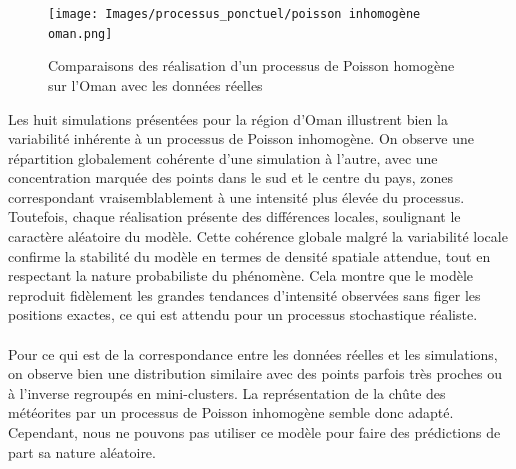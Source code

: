\documentclass[12pt]{article}
\begin{document}
\begin{figure}[H]
    \centering
    \texttt{[image: Images/processus\_ponctuel/poisson inhomogène oman.png]}
    \caption{Comparaisons des réalisation d'un processus de Poisson homogène sur l'Oman avec les données réelles}
\end{figure}

Les huit simulations présentées pour la région d’Oman illustrent bien la variabilité inhérente à un processus de Poisson inhomogène. On observe une répartition globalement cohérente d’une simulation à l’autre, avec une concentration marquée des points dans le sud et le centre du pays, zones correspondant vraisemblablement à une intensité plus élevée du processus. Toutefois, chaque réalisation présente des différences locales, soulignant le caractère aléatoire du modèle. Cette cohérence globale malgré la variabilité locale confirme la stabilité du modèle en termes de densité spatiale attendue, tout en respectant la nature probabiliste du phénomène. Cela montre que le modèle reproduit fidèlement les grandes tendances d’intensité observées sans figer les positions exactes, ce qui est attendu pour un processus stochastique réaliste.\\
\\
Pour ce qui est de la correspondance entre les données réelles et les simulations, on observe bien une distribution similaire avec des points parfois très proches ou à l'inverse regroupés en mini-clusters. La représentation de la chûte des météorites par un processus de Poisson inhomogène semble donc adapté. Cependant, nous ne pouvons pas utiliser ce modèle pour faire des prédictions de part sa nature aléatoire.
\end{document}
